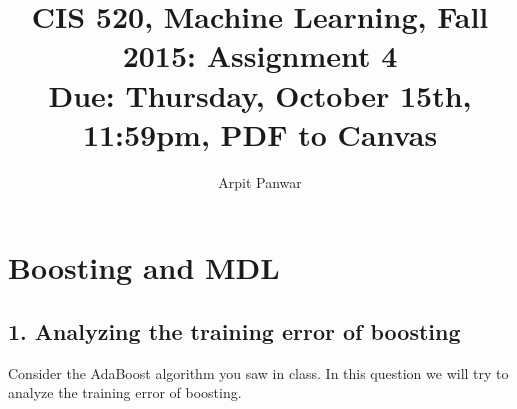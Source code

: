 \documentclass[english]{article}
\title{CIS 520, Machine Learning, Fall 2015: Assignment 4 \\
Due: Thursday, October 15th, 11:59pm, PDF to Canvas\\}
\date{}
\author{Arpit Panwar}
\begin{document}
\maketitle

\section*{Boosting and MDL}
\label{sec:boosting}

\subsection*{1. Analyzing the training error of boosting}

Consider the AdaBoost algorithm you saw in class. In this question
we will try to analyze the training error of boosting.
\end{document}
